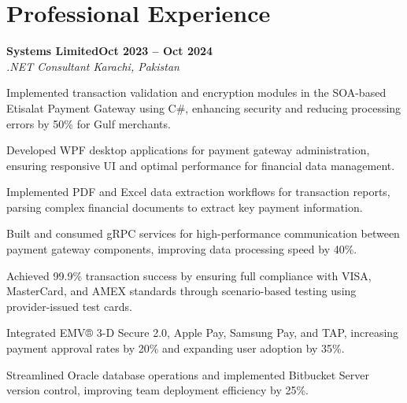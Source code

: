 \documentclass[letterpaper,10pt]{article}
\newcommand{\headingBf}[2]{
  \hspace{10pt}\textbf{#1}\hfill\textbf{#2}\\
}
\newcommand{\headingIt}[2]{
  \hspace{10pt}\textit{#1}\hfill\textit{#2}\\
}
\newenvironment{resume_list}{
  \vspace{-7pt}
  \begin{itemize}[itemsep=-2px, parsep=1pt, leftmargin=30pt]
}{
  \end{itemize}
}
\begin{document}
\section{Professional Experience}

\headingBf{Systems Limited}{Oct 2023 -- Oct 2024}
\headingIt{.NET Consultant \hfill Karachi, Pakistan}{}
\begin{resume_list}
    \item Implemented transaction validation and encryption modules in the SOA-based Etisalat Payment Gateway using C\#, enhancing security and reducing processing errors by 50\% for Gulf merchants.
    \item Developed WPF desktop applications for payment gateway administration, ensuring responsive UI and optimal performance for financial data management.
    \item Implemented PDF and Excel data extraction workflows for transaction reports, parsing complex financial documents to extract key payment information.
    \item Built and consumed gRPC services for high-performance communication between payment gateway components, improving data processing speed by 40\%.
    \item Achieved 99.9\% transaction success by ensuring full compliance with VISA, MasterCard, and AMEX standards through scenario-based testing using provider-issued test cards.
    \item Integrated EMV® 3-D Secure 2.0, Apple Pay, Samsung Pay, and TAP, increasing payment approval rates by 20\% and expanding user adoption by 35\%.
    \item Streamlined Oracle database operations and implemented Bitbucket Server version control, improving team deployment efficiency by 25\%.
\end{resume_list}
\end{document}
